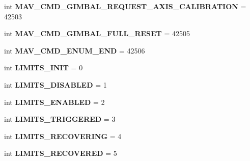 \begin{DoxyCompactItemize}
int {\bfseries M\+A\+V\+\_\+\+C\+M\+D\+\_\+\+G\+I\+M\+B\+A\+L\+\_\+\+R\+E\+Q\+U\+E\+S\+T\+\_\+\+A\+X\+I\+S\+\_\+\+C\+A\+L\+I\+B\+R\+A\+T\+I\+ON} = 42503
\item 
\mbox{\label{namespacepymavlink_1_1dialects_1_1v10_a64d228cc78fa3547b82c116ac5b4c044}} 
int {\bfseries M\+A\+V\+\_\+\+C\+M\+D\+\_\+\+G\+I\+M\+B\+A\+L\+\_\+\+F\+U\+L\+L\+\_\+\+R\+E\+S\+ET} = 42505
\item 
\mbox{\label{namespacepymavlink_1_1dialects_1_1v10_aa1b6c8e6154eb8c68f5efd29435a91cd}} 
int {\bfseries M\+A\+V\+\_\+\+C\+M\+D\+\_\+\+E\+N\+U\+M\+\_\+\+E\+ND} = 42506
\item 
\mbox{\label{namespacepymavlink_1_1dialects_1_1v10_a66282b4feca26d6891201d29db49332a}} 
int {\bfseries L\+I\+M\+I\+T\+S\+\_\+\+I\+N\+IT} = 0
\item 
\mbox{\label{namespacepymavlink_1_1dialects_1_1v10_a362cba85c7db2ef23e25c126ecf943e8}} 
int {\bfseries L\+I\+M\+I\+T\+S\+\_\+\+D\+I\+S\+A\+B\+L\+ED} = 1
\item 
\mbox{\label{namespacepymavlink_1_1dialects_1_1v10_ad3c0ff63060f8f1a1ac247c95b48778c}} 
int {\bfseries L\+I\+M\+I\+T\+S\+\_\+\+E\+N\+A\+B\+L\+ED} = 2
\item 
\mbox{\label{namespacepymavlink_1_1dialects_1_1v10_a5feb67c0a63991a60bc9dba5f9f83989}} 
int {\bfseries L\+I\+M\+I\+T\+S\+\_\+\+T\+R\+I\+G\+G\+E\+R\+ED} = 3
\item 
\mbox{\label{namespacepymavlink_1_1dialects_1_1v10_ab20c3d1122ee12007fa1cac2e37db6e9}} 
int {\bfseries L\+I\+M\+I\+T\+S\+\_\+\+R\+E\+C\+O\+V\+E\+R\+I\+NG} = 4
\item 
\mbox{\label{namespacepymavlink_1_1dialects_1_1v10_a92986027dc69366eaef75a3e559e5a40}} 
int {\bfseries L\+I\+M\+I\+T\+S\+\_\+\+R\+E\+C\+O\+V\+E\+R\+ED} = 5
\item 
\mbox{\label{namespacepymavlink_1_1dialects_1_1v10_a1dfa9de4320551b8f1819c7105304fad}} 

\end{DoxyCompactItemize}
